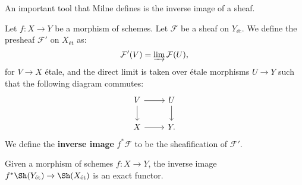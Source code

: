 
An important tool that Milne \cite[Section~I.8]{milne2013lectures} defines is the inverse image of a sheaf.

\begin{definition}
Let $f:X\rightarrow Y$ be a morphism of schemes. Let $\mathcal{F}$ be a sheaf on $Y_{\text{\'{e}t}}$. We define the presheaf $\mathcal{F}'$ on $X_{\text{\'{e}t}}$ as:
\[\mathcal{F}'(V)=\varinjlim\mathcal{F}(U),\]
for $V\rightarrow X$ \'{e}tale, and the direct limit is taken over \'{e}tale morphisms $U\rightarrow Y$ such that the following diagram commutes:
\[
\begin{tikzcd}
V\arrow[r]\arrow[d]&U\arrow[d]\\
X\arrow[r]&Y.
\end{tikzcd}
\]
We define the \textbf{inverse image} $f^*\mathcal{F}$ to be the sheafification of $\mathcal{F}'$.
\end{definition}

\begin{proposition}
Given a morphism of schemes $f:X\rightarrow Y$, the inverse image $f^*\Sh(Y_{\text{\'{e}t}})\rightarrow\Sh(X_{\text{\'{e}t}})$ is an exact functor.
\end{proposition}
